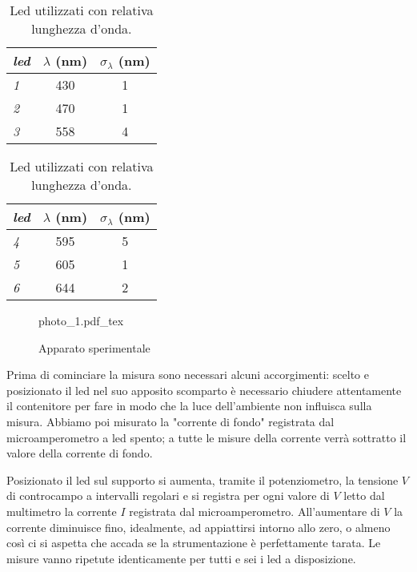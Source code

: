 \documentclass[9pt,a4paper,twocolumn,twoside]{tau-class/tau}
\newcommand{\incfig}[1]{%
	{#1.pdf_tex}
}
\begin{document}
 \begin{table}[H]
    \centering
    \begin{tabular}{@{}lcc@{}}
        \toprule
        \textit{led} & \(\lambda\) (nm) & \(\sigma_\lambda\) (nm) \\
        \midrule
        \textit{1} & 430 & 1 \\
        \textit{2} & 470 & 1 \\
        \textit{3} & 558 & 4 \\ 
        \bottomrule  
    \end{tabular}
    \hspace{1cm} %
    \begin{tabular}{@{}lcc@{}}
        \toprule
        \textit{led} & \(\lambda\) (nm) & \(\sigma_\lambda\) (nm) \\
        \midrule
        \textit{4} & 595 & 5 \\
        \textit{5} & 605 & 1 \\
        \textit{6} & 644 & 2 \\ 
        \bottomrule  
    \end{tabular}
    \caption{Led utilizzati con relativa lunghezza d'onda.}
\end{table}
    
\begin{figure}[H]
    \centering
    \incfig{photo_1}
    \caption{Apparato sperimentale}
\end{figure}

Prima di cominciare la misura sono necessari alcuni accorgimenti: scelto e posizionato il led nel suo apposito scomparto è necessario chiudere attentamente il contenitore per fare in modo che la luce dell'ambiente non influisca sulla misura. Abbiamo poi misurato la "corrente di fondo" registrata dal microamperometro a led spento; a tutte le misure della corrente verrà sottratto il valore della corrente di fondo. 

Posizionato il led sul supporto si aumenta, tramite il potenziometro, la tensione \(V\) di controcampo a intervalli regolari e si registra per ogni valore di \(V\) letto dal multimetro la corrente \(I\) registrata dal microamperometro.  All'aumentare di \(V\) la corrente diminuisce fino, idealmente, ad appiattirsi intorno allo zero, o almeno così ci si aspetta che accada se la strumentazione è perfettamente tarata. Le misure vanno ripetute identicamente per tutti e sei i led a disposizione. 
\end{document}
